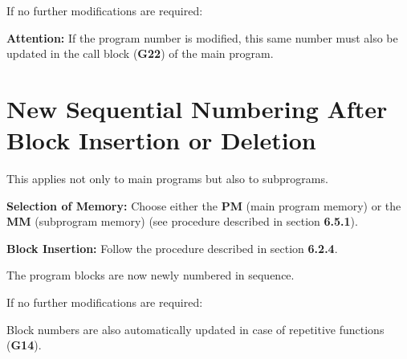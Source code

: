 \vspace{.5cm}

If no further modifications are required:

\begin{itemize}
\end{itemize}

\vspace{.5cm}

\textbf{Attention:}  
If the program number is modified, this same number must also be updated in the call block (\textbf{G22}) of the main program.

\section{New Sequential Numbering After Block Insertion or Deletion}

This applies not only to main programs but also to subprograms.

\textbf{Selection of Memory:}  
Choose either the \textbf{PM} (main program memory) or the \textbf{MM} (subprogram memory)  
(see procedure described in section \textbf{6.5.1}).

\textbf{Block Insertion:}  
Follow the procedure described in section \textbf{6.2.4}.

\begin{itemize}
\end{itemize}

The program blocks are now newly numbered in sequence.

\vspace{.5cm}

If no further modifications are required:

\begin{itemize}
\end{itemize}

\vspace{.5cm}

\notes

Block numbers are also automatically updated in case of repetitive functions (\textbf{G14}).